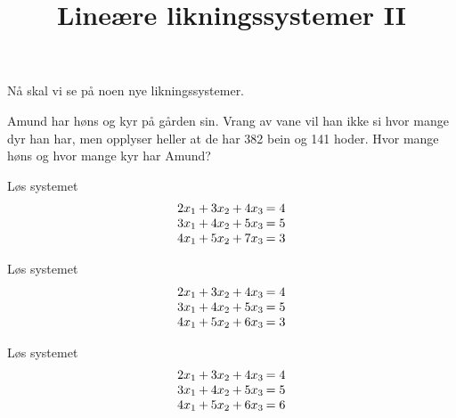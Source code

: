 

\title{Lineære likningssystemer II}




\maketitle

Nå skal vi se på noen nye likningssystemer.


\begin{oppgave}{1}
Amund har høns og kyr på gården sin. Vrang av vane vil han ikke si hvor mange dyr han har, men opplyser heller at de har 382 bein og 141 hoder. Hvor mange høns og hvor mange kyr har Amund?
\end{oppgave}

\begin{oppgave}{2}
Løs systemet
\[
\setlength\arraycolsep{1pt}
\begin{array}{rcrcrc@{\;}l}
  2x_1   & + &   3x_2   & + &      4x_3  &  =   &  4 \\
   3x_1   & + &  4x_2   & + &       5x_3   &  =   &  5 \\
  4x_1   &  + &    5 x_2   &  + &   7x_3   &  =   &  3 
\end{array}
\]
\end{oppgave}


\begin{oppgave}{3}
Løs systemet
\[
\setlength\arraycolsep{1pt}
\begin{array}{rcrcrc@{\;}l}
  2x_1   & + &   3x_2   & + &      4x_3  &  =   &  4 \\
   3x_1   & + &  4x_2   & + &       5x_3   &  =   &  5 \\
  4x_1   &  + &    5 x_2   &  + &   6x_3   &  =   &  3 
\end{array}
\]
\end{oppgave}


\begin{oppgave}{4}
Løs systemet
\[
\setlength\arraycolsep{1pt}
\begin{array}{rcrcrc@{\;}l}
  2x_1   & + &   3x_2   & + &      4x_3  &  =   &  4 \\
   3x_1   & + &  4x_2   & + &       5x_3   &  =   &  5 \\
  4x_1   &  + &    5 x_2   &  + &   6x_3   &  =   &  6 
\end{array}
\]
\end{oppgave}


